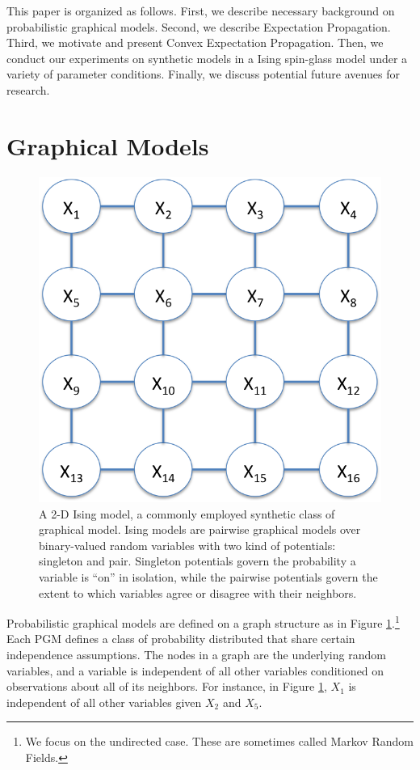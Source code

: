 \documentclass[times, 10pt,twocolumn]{article}
\begin{document}
This paper is organized as follows. First, we describe necessary
background on probabilistic graphical models. Second, we describe
Expectation Propagation. Third, we motivate and present Convex
Expectation Propagation. Then, we conduct our experiments on
synthetic models in a Ising spin-glass model under a variety of
parameter conditions. Finally, we discuss potential future avenues
for research.

\section{Graphical Models}
\begin{figure}[t]
  \centering
  \includegraphics[scale=0.6]{ising.png}
  \caption{A 2-D Ising model, a commonly employed synthetic class of
  graphical model. Ising models are pairwise graphical models over
  binary-valued random variables with
  two kind of potentials: singleton and pair. Singleton potentials
  govern the probability a variable is ``on'' in isolation, while
  the pairwise potentials govern the extent to which variables
  agree or disagree with their neighbors.}
  \label{fig:ising}
\end{figure}

Probabilistic graphical models are defined on a graph structure as
in Figure \ref{fig:ising}.\footnote{We focus on the undirected case.
These are sometimes called Markov Random Fields.} Each PGM defines
a class of probability distributed that share certain independence
assumptions.  The nodes in a graph are the underlying random variables,
and a variable is independent of all other variables conditioned on
observations about all of its neighbors. For instance, in Figure
\ref{fig:ising}, $X_1$ is independent of all other variables given
$X_2$ and $X_5$.
\end{document}

